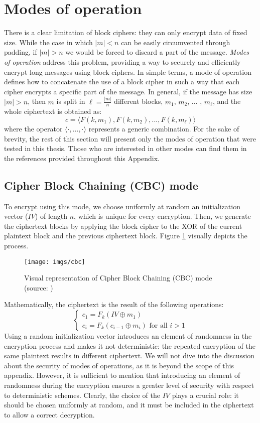 \documentclass[target=mst,aauheader=aics]{thud}
\theoremstyle{definition}
\begin{document}
	\section{Modes of operation}\label{sec:modes}
	There is a clear limitation of block ciphers: they can only encrypt data of fixed size. While the case in which $|m| < n$ can be easily circumvented through padding, if $|m| > n$ we would be forced to discard a part of the message. \textit{Modes of operation} address this problem, providing a way to securely and efficiently encrypt long messages using block ciphers. In simple terms, a mode of operation defines how to concatenate the use of a block cipher in such a way that each cipher encrypts a specific part of the message. In general, if the message has size $|m| > n$, then $m$ is split in $\ell = \frac{|m|}{n}$ different blocks, $m_1$, $m_2$, ... , $m_{\ell}$, and the whole ciphertext is obtained as:
	\[
	c = \langle F(k, m_1), F(k, m_2), ..., F(k, m_{\ell})\rangle
	\]
	where the operator $\langle \cdot , ..., \cdot \rangle$ represents a generic combination. For the sake of brevity, the rest of this section will present only the modes of operation that were tested in this thesis. Those who are interested in other modes can find them in the references provided throughout this Appendix.

	\subsection{Cipher Block Chaining (CBC) mode}
	To encrypt using this mode, we choose uniformly at random an initialization vector ($IV$) of length $n$, which is unique for every encryption. Then, we generate the ciphertext blocks by applying the block cipher to the XOR of the current plaintext block and the previous ciphertext block. Figure \ref{fig:cbc} visually depicts the process.
	\begin{figure}
		\centering
		\texttt{[image: imgs/cbc]}
		\captionsetup{width=.7\linewidth}
		\caption{Visual representation of Cipher Block Chaining (CBC) mode (source: \cite{Katz2007})}
		\label{fig:cbc}
	\end{figure}
	Mathematically, the ciphertext is the result of the following operations:
	\[
	\begin{cases}
		c_1 = F_k(IV \oplus m_1)\\
		c_i = F_k(c_{i-1}\oplus m_i) \text{ for all } i>1
	\end{cases}
	\]
	Using a random initialization vector introduces an element of randomness in the encryption process and makes it not deterministic: the repeated encryption of the same plaintext results in different ciphertext. 
	We will not dive into the discussion about the security of modes of operations, as it is beyond the scope of this appendix. However, it is sufficient to mention that introducing an element of randomness during the encryption ensures a greater level of security with respect to deterministic schemes. Clearly, the choice of the $IV$ plays a crucial role: it should be chosen uniformly at random, and it must be included in the ciphertext to allow a correct decryption.
	
\end{document}
